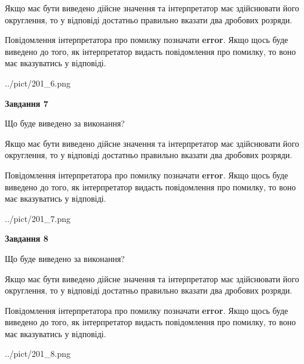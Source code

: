 \documentclass[12pt, ukrainian]{article}
\begin{document}
{\begin {Large}
Якщо має бути виведено дійсне значення та інтерпретатор має здійснювати його округлення, 
то у відповіді достатньо правильно вказати два дробових розряди.

Повідомлення інтерпретатора про помилку позначати \textbf{error}.
Якщо щось буде виведено до того, як інтерпретатор видасть повідомлення про помилку, 
то воно має вказуватись у відповіді. \par

\begin{center}
	{../pict/201_6.png}
\end{center}
\newpage

{\begin {center}\textbf{Завдання 7}\end {center}}\par
Що буде виведено за виконання? \par

Якщо має бути виведено дійсне значення та інтерпретатор має здійснювати його округлення, 
то у відповіді достатньо правильно вказати два дробових розряди.

Повідомлення інтерпретатора про помилку позначати \textbf{error}.
Якщо щось буде виведено до того, як інтерпретатор видасть повідомлення про помилку, 
то воно має вказуватись у відповіді. \par

\begin{center}
	{../pict/201_7.png}
\end{center}
\newpage

{\begin {center}\textbf{Завдання 8}\end {center}}\par
Що буде виведено за виконання? \par

Якщо має бути виведено дійсне значення та інтерпретатор має здійснювати його округлення, 
то у відповіді достатньо правильно вказати два дробових розряди.

Повідомлення інтерпретатора про помилку позначати \textbf{error}.
Якщо щось буде виведено до того, як інтерпретатор видасть повідомлення про помилку, 
то воно має вказуватись у відповіді. \par

\begin{center}
	{../pict/201_8.png}
\end{center}
\newpage


\end{Large}}
\end{document}
